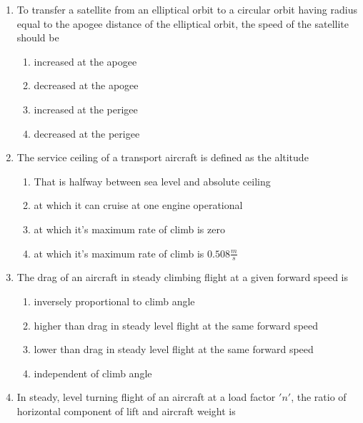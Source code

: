 \documentclass[journal]{IEEEtran}
\begin{document}
\begin{enumerate}
    \item To transfer a satellite from an elliptical orbit to a circular orbit having radius equal to the apogee distance of the elliptical orbit, the speed of the satellite should be

		\begin{multicols}{2}
			\begin{enumerate}
				\item increased at the apogee
				\item decreased at the apogee
				\item increased at the perigee
				\item decreased at the perigee
			\end{enumerate}
		\end{multicols}

    \item The service ceiling of a transport aircraft is defined as the altitude

       \begin{enumerate}
            \item That is halfway between sea level and absolute ceiling
            \item at which it can cruise at one engine operational
            \item at which it's maximum rate of climb is zero
            \item at which it's maximum rate of climb is $0.508\frac{m}{s}$
        \end{enumerate}
  
    \item The drag of an aircraft in steady climbing flight at a given forward speed is 

        \begin{enumerate}
            \item inversely proportional to climb angle
            \item higher than drag in steady level flight at the same forward speed
            \item lower than drag in steady level flight at the same forward speed
            \item independent of climb angle
        \end{enumerate}

    \item In steady, level turning flight of an aircraft at a load factor $'n'$, the ratio of horizontal component of lift and aircraft weight is


\end{enumerate}
\end{document}
